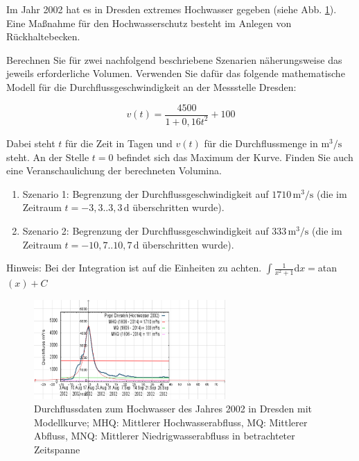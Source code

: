 Im Jahr 2002 hat es in Dresden extremes Hochwasser gegeben (siehe Abb. \ref{fig1}). Eine Maßnahme für den Hochwasserschutz besteht im Anlegen von Rückhaltebecken. 

Berechnen Sie für zwei nachfolgend beschriebene Szenarien näherungsweise das jeweils erforderliche Volumen. Verwenden Sie dafür das folgende mathematische Modell für die Durchflussgeschwindigkeit an der Messstelle Dresden:

$$v(t)=\frac{4500}{1+0,16t^2}+100$$

Dabei steht $t$ für die Zeit in Tagen und $v(t)$ für die Durchflussmenge in $\text{m}^3/\text{s}$ steht. An der Stelle $t=0$ befindet sich das Maximum  der Kurve. Finden Sie auch eine Veranschaulichung der berechneten Volumina.

\begin{enumerate}[label=(\roman*)]

\item Szenario 1: Begrenzung der Durchflussgeschwindigkeit auf $1710\, \text{m}^3/\text{s}$ (die im Zeitraum $t=-3,3..3,3\,\text{d}$
überschritten wurde).

\item Szenario 2: Begrenzung der Durchflussgeschwindigkeit auf $333\, \text{m}^3/\text{s}$ (die im Zeitraum $t=-10,7..10,7\,\text{d}$
überschritten wurde).

\end{enumerate}

Hinweis: Bei der Integration ist auf die Einheiten zu achten. $\int \frac{1}{x^2+1}$d$x=$atan$(x)+C$

\begin{figure}[ht]
	\centering
  \includegraphics[width=0.65\textwidth]{../pool/ex-fn-model-1-img-a.png}
	\caption{Durchflussdaten zum Hochwasser des Jahres 2002 in Dresden mit Modellkurve; MHQ: Mittlerer Hochwasserabfluss, MQ: Mittlerer Abfluss, MNQ: Mittlerer Niedrigwasserabfluss in betrachteter Zeitspanne }
	\label{fig1}
\end{figure}


